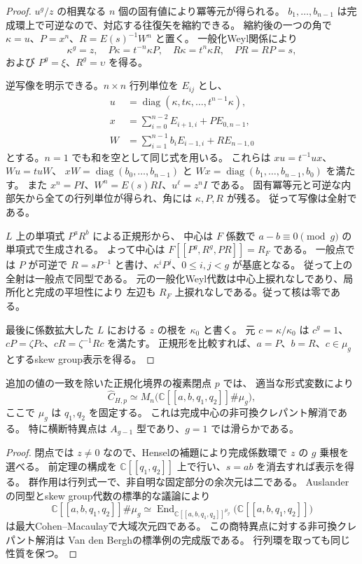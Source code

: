 \begin{proof}
$u^g/z$ の相異なる $n$ 個の固有値により冪等元が得られる。
$b_1,\ldots,b_{n-1}$ は完成環上で可逆なので、対応する往復矢を縮約できる。
縮約後の一つの角で $\kappa=u$、$P=x^n$、$R=E(s)^{-1}W^n$ と置く。
一般化Weyl関係により
\[
 \kappa^g=z,\quad P\kappa=t^{-n}\kappa P,\quad
 R\kappa=t^n\kappa R,\quad PR=RP=s,
\]
および $P^g=\xi$、$R^g=\upsilon$ を得る。

逆写像を明示できる。$n\times n$ 行列単位を $E_{ij}$ とし、
\begin{align*}
 u&=\operatorname{diag}(\kappa,t\kappa,\ldots,t^{n-1}\kappa),\\
 x&=\sum_{i=0}^{n-2}E_{i+1,i}+P E_{0,n-1},\\
 W&=\sum_{i=1}^{n-1}b_iE_{i-1,i}+R E_{n-1,0}
\end{align*}
とする。$n=1$ でも和を空として同じ式を用いる。
これらは $xu=t^{-1}ux$、$Wu=tuW$、
$xW=\operatorname{diag}(b_0,\ldots,b_{n-1})$ と
$Wx=\operatorname{diag}(b_1,\ldots,b_{n-1},b_0)$ を満たす。
また $x^n=P I$、$W^n=E(s)R I$、$u^\ell=z^n I$ である。
固有冪等元と可逆な内部矢から全ての行列単位が得られ、角には $\kappa,P,R$ が残る。
従って写像は全射である。

$L$ 上の単項式 $P^aR^b$ による正規形から、
中心は $F$ 係数で $a-b\equiv0\pmod g$ の単項式で生成される。
よって中心は $F[[P^g,R^g,PR]]=R_F$ である。
一般点では $P$ が可逆で $R=sP^{-1}$ と書け、$\kappa^iP^j$、$0\le i,j<g$ が基底となる。
従って上の全射は一般点で同型である。
元の一般化Weyl代数は中心上捩れなしであり、局所化と完成の平坦性により
左辺も $R_F$ 上捩れなしである。従って核は零である。

最後に係数拡大した $L$ における $z$ の根を $\kappa_0$ と書く。
元 $c=\kappa/\kappa_0$ は $c^g=1$、$cP=\zeta Pc$、$cR=\zeta^{-1}Rc$ を満たす。
正規形を比較すれば、$a=P$、$b=R$、$c\in\mu_g$ とするskew group表示を得る。
\end{proof}

\begin{corollary}[一般境界の閉点における非可換クレパント解消]
\label{cor:boundary-closed-McKay-v40}
追加の値の一致を除いた正規化境界の複素閉点 $p$ では、
適当な形式変数により
\[
 \widehat{C}_{H,p}\simeq
 M_n\bigl(\mathbb C[[a,b,q_1,q_2]]\#\mu_g\bigr),
\]
ここで $\mu_g$ は $q_1,q_2$ を固定する。
これは完成中心の非可換クレパント解消である。
特に横断特異点は $A_{g-1}$ 型であり、$g=1$ では滑らかである。
\end{corollary}

\begin{proof}
閉点では $z\ne0$ なので、Henselの補題により完成係数環で $z$ の $g$ 乗根を選べる。
前定理の構成を $\mathbb C[[q_1,q_2]]$ 上で行い、$s=ab$ を消去すれば表示を得る。
群作用は行列式一で、非自明な固定部分の余次元は二である。
Auslanderの同型とskew group代数の標準的な議論により
\[
 \mathbb C[[a,b,q_1,q_2]]\#\mu_g
 \simeq\operatorname{End}_{\mathbb C[[a,b,q_1,q_2]]^{\mu_g}}
 \bigl(\mathbb C[[a,b,q_1,q_2]]\bigr)
\]
は最大Cohen--Macaulayで大域次元四である。
この商特異点に対する非可換クレパント解消は
Van den Bergh\cite[Example~1.1]{VanDenBerghMcKay38}の標準例の完成版である。
行列環を取っても同じ性質を保つ。
\end{proof}

